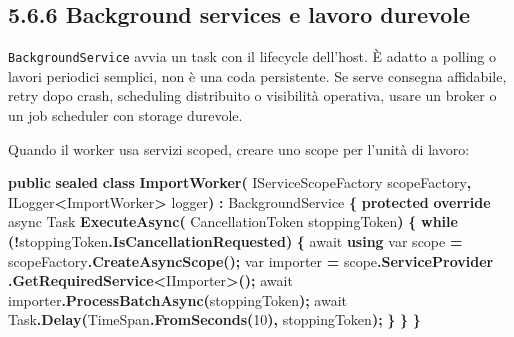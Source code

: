 \documentclass[
  italian,
  10pt,
]{book}
\newenvironment{Shaded}{\begin{snugshade}}{\end{snugshade}}
\newcommand{\DataTypeTok}[1]{\textcolor[rgb]{0.13,0.29,0.53}{#1}}
\newcommand{\DecValTok}[1]{\textcolor[rgb]{0.00,0.00,0.81}{#1}}
\newcommand{\FunctionTok}[1]{\textcolor[rgb]{0.13,0.29,0.53}{\textbf{#1}}}
\newcommand{\KeywordTok}[1]{\textcolor[rgb]{0.13,0.29,0.53}{\textbf{#1}}}
\newcommand{\NormalTok}[1]{#1}
\newcommand{\OperatorTok}[1]{\textcolor[rgb]{0.81,0.36,0.00}{\textbf{#1}}}
\begin{document}
\subsection{5.6.6 Background services e lavoro
durevole}\label{background-services-e-lavoro-durevole}

\texttt{BackgroundService} avvia un task con il lifecycle dell'host. È
adatto a polling o lavori periodici semplici, non è una coda
persistente. Se serve consegna affidabile, retry dopo crash, scheduling
distribuito o visibilità operativa, usare un broker o un job scheduler
con storage durevole.

Quando il worker usa servizi scoped, creare uno scope per l'unità di
lavoro:

\begin{Shaded}
\begin{Highlighting}[]
\KeywordTok{public} \KeywordTok{sealed} \KeywordTok{class} \FunctionTok{ImportWorker}\OperatorTok{(}
\NormalTok{    IServiceScopeFactory scopeFactory}\OperatorTok{,}
\NormalTok{    ILogger}\OperatorTok{\textless{}}\NormalTok{ImportWorker}\OperatorTok{\textgreater{}}\NormalTok{ logger}\OperatorTok{)} \OperatorTok{:}\NormalTok{ BackgroundService}
\OperatorTok{\{}
    \KeywordTok{protected} \KeywordTok{override}\NormalTok{ async Task }\FunctionTok{ExecuteAsync}\OperatorTok{(}
\NormalTok{        CancellationToken stoppingToken}\OperatorTok{)}
    \OperatorTok{\{}
        \KeywordTok{while} \OperatorTok{(!}\NormalTok{stoppingToken}\OperatorTok{.}\FunctionTok{IsCancellationRequested}\OperatorTok{)}
        \OperatorTok{\{}
\NormalTok{            await }\KeywordTok{using} \DataTypeTok{var}\NormalTok{ scope }\OperatorTok{=}\NormalTok{ scopeFactory}\OperatorTok{.}\FunctionTok{CreateAsyncScope}\OperatorTok{();}
            \DataTypeTok{var}\NormalTok{ importer }\OperatorTok{=}\NormalTok{ scope}\OperatorTok{.}\FunctionTok{ServiceProvider}
                \OperatorTok{.}\FunctionTok{GetRequiredService}\OperatorTok{\textless{}}\NormalTok{IImporter}\OperatorTok{\textgreater{}();}
\NormalTok{            await importer}\OperatorTok{.}\FunctionTok{ProcessBatchAsync}\OperatorTok{(}\NormalTok{stoppingToken}\OperatorTok{);}
\NormalTok{            await Task}\OperatorTok{.}\FunctionTok{Delay}\OperatorTok{(}\NormalTok{TimeSpan}\OperatorTok{.}\FunctionTok{FromSeconds}\OperatorTok{(}\DecValTok{10}\OperatorTok{),}\NormalTok{ stoppingToken}\OperatorTok{);}
        \OperatorTok{\}}
    \OperatorTok{\}}
\OperatorTok{\}}
\end{Highlighting}
\end{Shaded}
\end{document}
